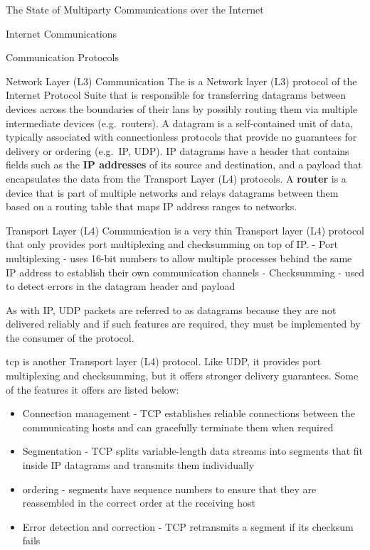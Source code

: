 \begin{frame}[fragile]{The State of Multiparty Communications over the
Internet}
\begin{block}{Internet Communications}
\begin{block}{Communication Protocols}
\protect\hypertarget{communication-protocols}{}
\begin{block}{Network Layer (L3) Communication}
\protect\hypertarget{network-layer-l3-communication}{}
The  \autocite{ipv4RFC} is a Network layer (L3) protocol of the
Internet Protocol Suite that is responsible for transferring datagrams
between devices across the boundaries of their \glspl{lan} by possibly
routing them via multiple intermediate devices (e.g.~routers). A
datagram is a self-contained unit of data, typically associated with
connectionless protocols that provide no guarantees for delivery or
ordering (e.g.~IP, UDP).
 IP datagrams
have a header that contains fields such as the \textbf{IP addresses} of
its source and destination, and a
payload that encapsulates the data from the Transport Layer (L4)
protocols. A \textbf{router} is a device that is part of multiple
networks and relays datagrams between them based on a routing table that
maps IP address ranges to networks.
\end{block}

\begin{block}{Transport Layer (L4) Communication}
\protect\hypertarget{transport-layer-l4-communication}{}
 is a very thin Transport layer (L4) protocol that only provides
port multiplexing and checksumming on top of IP. - Port multiplexing -
uses 16-bit numbers to allow multiple processes behind the same IP
address to establish their own communication channels - Checksumming -
used to detect errors in the datagram header and payload

As with IP, UDP packets are referred to as datagrams because they are
not delivered reliably and if such features are required, they must be
implemented by the consumer of the protocol.

\gls{tcp} is another Transport layer (L4) protocol. Like UDP, it
provides port multiplexing and checksumming, but it offers stronger
delivery guarantees. Some of the features it offers are listed below:

\begin{itemize}
\tightlist
\item
  Connection management - TCP establishes reliable connections between
  the communicating hosts and can gracefully terminate them when
  required
\item
  Segmentation - TCP splits variable-length data streams into segments
  that fit inside IP datagrams and transmits them individually
\item
  ordering - segments have sequence numbers to ensure that they are
  reassembled in the correct order at the receiving host
\item
  Error detection and correction - TCP retransmits a segment if its
  checksum fails
\end{itemize}


\end{block}
\end{block}
\end{block}
\end{frame}
